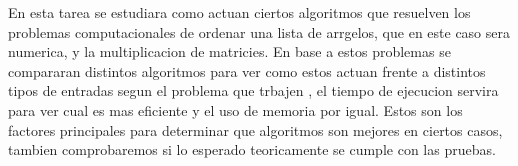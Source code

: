 \begin{mdframed}
    En esta tarea se estudiara como actuan ciertos algoritmos que resuelven los problemas
    computacionales de ordenar una lista de arrgelos, que en este caso sera numerica, y la 
    multiplicacion de matricies. En base a estos problemas se compararan distintos algoritmos para 
    ver como estos actuan frente a distintos tipos de entradas segun el problema que trbajen , el 
    tiempo de ejecucion servira para ver cual es mas eficiente y el uso de memoria por igual. 
    Estos son los factores principales para determinar que algoritmos son mejores en ciertos 
    casos, tambien comprobaremos si lo esperado teoricamente se cumple con las pruebas. 
\end{mdframed}
